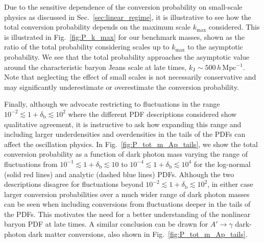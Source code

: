 \documentclass[prd,aps,10pt,nofootinbib,twocolumn,superscriptaddress,preprintnumbers,balancelastpage,longbibliography]{revtex4-1}
\begin{document}
Due to the sensitive dependence of the conversion probability on small-scale physics as discussed in Sec.~\ref{sec:linear_regime}, it is illustrative to see how the total conversion probability depends on the maximum scale $k_\mathrm{max}$ considered.  This is illustrated in Fig.~\ref{fig:P_k_max} for our benchmark masses, shown as the ratio of the total probability considering scales up to $k_\mathrm{max}$ to the asymptotic probability. We see that the total probability approaches the asymptotic value around the characteristic baryon Jeans scale at late times, $k_\mathrm{J} \sim 500\,h$\,Mpc$^{-1}$. Note that neglecting the effect of small scales is not necessarily conservative and may significantly underestimate or overestimate the conversion probability.

Finally, although we advocate restricting to fluctuations in the range $10^{-2} \lesssim 1 + \delta_\text{b} \lesssim 10^2$ where the different PDF descriptions considered show qualitative agreement, it is instructive to ask how expanding this range and including larger underdensities and overdensities in the tails of the PDFs can affect the oscillation physics. In Fig.~\ref{fig:P_tot_m_Ap_tails}, we show the total conversion probability as a function of dark photon mass varying the range of fluctuations from  $10^{-1} \lesssim 1 + \delta_\text{b} \lesssim 10$ to $10^{-4} \lesssim 1 + \delta_\text{b} \lesssim 10^4$ for the log-normal (solid red lines) and analytic (dashed blue lines) PDFs. Although the two descriptions disagree for fluctuations beyond $10^{-2} \lesssim 1 + \delta_\text{b} \lesssim 10^2$, in either case larger conversion probabilities over a much wider range of dark photon masses can be seen when including conversions from fluctuations deeper in the tails of the PDFs. This motivates the need for a better understanding of the nonlinear baryon PDF at late times. A similar conclusion can be drawn for $A' \to \gamma$ dark-photon dark matter conversions, also shown in Fig.~\ref{fig:P_tot_m_Ap_tails}. 
\end{document}
